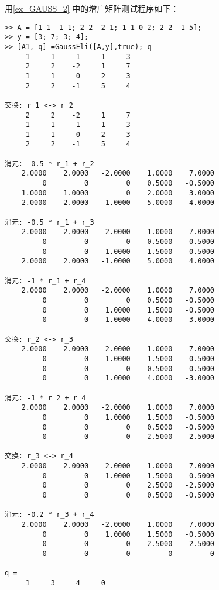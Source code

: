 用\autoref{ex_GAUSS_2}  中的增广矩阵测试程序如下：
\begin{lstlisting}[language=matlabC]
>> A = [1 1 -1 1; 2 2 -2 1; 1 1 0 2; 2 2 -1 5];
>> y = [3; 7; 3; 4];
>> [A1, q] =GaussEli([A,y],true); q
     1     1    -1     1     3
     2     2    -2     1     7
     1     1     0     2     3
     2     2    -1     5     4

交换: r_1 <-> r_2
     2     2    -2     1     7
     1     1    -1     1     3
     1     1     0     2     3
     2     2    -1     5     4

消元: -0.5 * r_1 + r_2
    2.0000    2.0000   -2.0000    1.0000    7.0000
         0         0         0    0.5000   -0.5000
    1.0000    1.0000         0    2.0000    3.0000
    2.0000    2.0000   -1.0000    5.0000    4.0000

消元: -0.5 * r_1 + r_3
    2.0000    2.0000   -2.0000    1.0000    7.0000
         0         0         0    0.5000   -0.5000
         0         0    1.0000    1.5000   -0.5000
    2.0000    2.0000   -1.0000    5.0000    4.0000

消元: -1 * r_1 + r_4
    2.0000    2.0000   -2.0000    1.0000    7.0000
         0         0         0    0.5000   -0.5000
         0         0    1.0000    1.5000   -0.5000
         0         0    1.0000    4.0000   -3.0000

交换: r_2 <-> r_3
    2.0000    2.0000   -2.0000    1.0000    7.0000
         0         0    1.0000    1.5000   -0.5000
         0         0         0    0.5000   -0.5000
         0         0    1.0000    4.0000   -3.0000

消元: -1 * r_2 + r_4
    2.0000    2.0000   -2.0000    1.0000    7.0000
         0         0    1.0000    1.5000   -0.5000
         0         0         0    0.5000   -0.5000
         0         0         0    2.5000   -2.5000

交换: r_3 <-> r_4
    2.0000    2.0000   -2.0000    1.0000    7.0000
         0         0    1.0000    1.5000   -0.5000
         0         0         0    2.5000   -2.5000
         0         0         0    0.5000   -0.5000

消元: -0.2 * r_3 + r_4
    2.0000    2.0000   -2.0000    1.0000    7.0000
         0         0    1.0000    1.5000   -0.5000
         0         0         0    2.5000   -2.5000
         0         0         0         0         0
         
q =
     1     3     4     0
\end{lstlisting}
